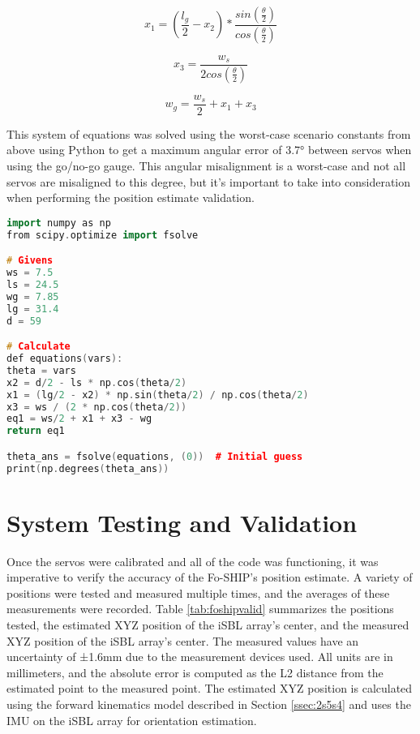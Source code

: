 \documentclass[12pt,a4paper]{report}
\begin{document}
\begin{equation}\label{eq:2ew15}
	x_1 = (\frac{l_g}{2} - x_2) * \frac{sin(\frac{\theta}{2})}{cos(\frac{\theta}{2})}
\end{equation}

\begin{equation}\label{eq:2eq16}
	x_3 = \frac{w_s}{2cos(\frac{\theta}{2})}
\end{equation}

\begin{equation}\label{eq:2eq17}
	w_g = \frac{w_s}{2} + x_1 + x_3
\end{equation}

This system of equations was solved using the worst-case scenario constants from above using Python to get a maximum angular error of 3.7° between servos when using the go/no-go gauge. This angular misalignment is a worst-case and not all servos are misaligned to this degree, but it’s important to take into consideration when performing the position estimate validation.

\begin{lstlisting}[language=C++]
import numpy as np
from scipy.optimize import fsolve

# Givens
ws = 7.5
ls = 24.5
wg = 7.85
lg = 31.4
d = 59

# Calculate
def equations(vars):
theta = vars
x2 = d/2 - ls * np.cos(theta/2)
x1 = (lg/2 - x2) * np.sin(theta/2) / np.cos(theta/2)
x3 = ws / (2 * np.cos(theta/2))
eq1 = ws/2 + x1 + x3 - wg
return eq1

theta_ans = fsolve(equations, (0))  # Initial guess
print(np.degrees(theta_ans))
\end{lstlisting}

\section{System Testing and Validation} \label{sec:2s7}
Once the servos were calibrated and all of the code was functioning, it was imperative to verify the accuracy of the Fo-SHIP’s position estimate. A variety of positions were tested and measured multiple times, and the averages of these measurements were recorded. Table \ref{tab:foshipvalid} summarizes the positions tested, the estimated XYZ position of the iSBL array’s center, and the measured XYZ position of the iSBL array’s center. The measured values have an uncertainty of ±1.6mm due to the measurement devices used. All units are in millimeters, and the absolute error is computed as the L2 distance from the estimated point to the measured point. The estimated XYZ position is calculated using the forward kinematics model described in Section \ref{ssec:2s5s4} and uses the IMU on the iSBL array for orientation estimation.
\end{document}
